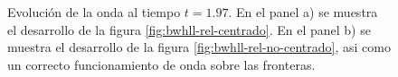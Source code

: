 \documentclass[12pt,a4paper]{book}
\begin{document}
\begin{figure}[H]
\centering
{}
\caption{Evolución de la onda al tiempo $t = 1.97$. En el panel a) se muestra el desarrollo de la figura \ref{fig:bwhll-rel-centrado}. En el panel b) se muestra el desarrollo de la figura \ref{fig:bwhll-rel-no-centrado}, asi como un correcto funcionamiento de onda sobre las fronteras.}
\end{figure}
\end{document}
